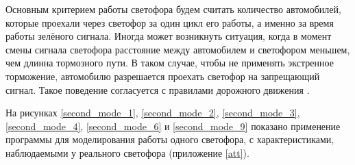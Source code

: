 \documentclass[12pt, a4paper]{extarticle}
\numberwithin{equation}{section}
\numberwithin{figure}{section}
\begin{document}
Основным критерием работы светофора будем считать количество автомобилей, которые проехали через светофор за один цикл его работы, а именно за время работы зелёного сигнала. Иногда может возникнуть ситуация, когда в момент смены сигнала светофора расстояние между автомобилем и светофором меньшем, чем длинна тормозного пути. В таком случае, чтобы не применять экстренное торможение, автомобилю разрешается проехать светофор на запрещающий сигнал. Такое поведение согласуется с правилами дорожного движения \cite{PDD}.

На рисунках \ref{second_mode_1}, \ref{second_mode_2}, \ref{second_mode_3}, \ref{second_mode_4}, \ref{second_mode_6} и \ref{second_mode_9} показано применение программы для моделирования работы одного светофора, с характеристиками, наблюдаемыми у реального светофора (приложение \ref{att}).
\end{document}

